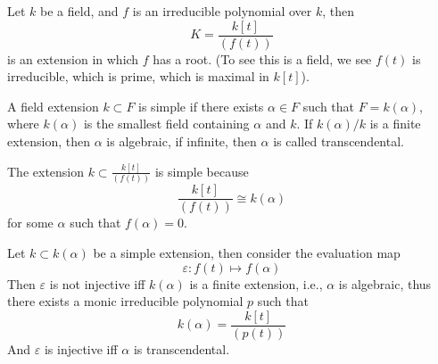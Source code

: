 \documentclass[openany]{book}
\begin{document}
\begin{example}
    Let $k$ be a field, and $f$ is an irreducible polynomial over $k$, then 
    \begin{equation*}
        K=\frac{k[t]}{(f(t))}
    \end{equation*}
    is an extension in which $f$ has a root. (To see this is a field, we see $f(t)$ is irreducible, which is prime, which is maximal in $k[t]$).
\end{example}


\begin{defn}
    A field extension $k\subset F$ is simple if there exists $\alpha\in F$ such that $F=k(\alpha)$, where $k(\alpha)$ is the smallest field containing $\alpha$ and $k$. If $k(\alpha)/k$ is a finite extension, then $\alpha$ is algebraic, if infinite, then $\alpha$ is called transcendental.
\end{defn}

\begin{example}
    The extension $k\subset\frac{k[t]}{(f(t))}$ is simple because 
    \begin{equation*}
        \frac{k[t]}{(f(t))}\cong k(\alpha)
    \end{equation*}
    for some $\alpha$ such that $f(\alpha)=0$.
\end{example}




\begin{prop}
    Let $k\subset k(\alpha)$ be a simple extension, then consider the evaluation map 
    \begin{equation*}
        \varepsilon: f(t)\mapsto f(\alpha)
    \end{equation*}
    Then $\varepsilon$ is not injective iff $k(\alpha)$ is a finite extension, i.e., $\alpha$ is algebraic, thus there exists a monic irreducible polynomial $p$ such that 
    \begin{equation*}
        k(\alpha)=\frac{k[t]}{(p(t))}
    \end{equation*}
    And $\varepsilon$ is injective iff $\alpha$ is transcendental.
\end{prop}
\end{document}
